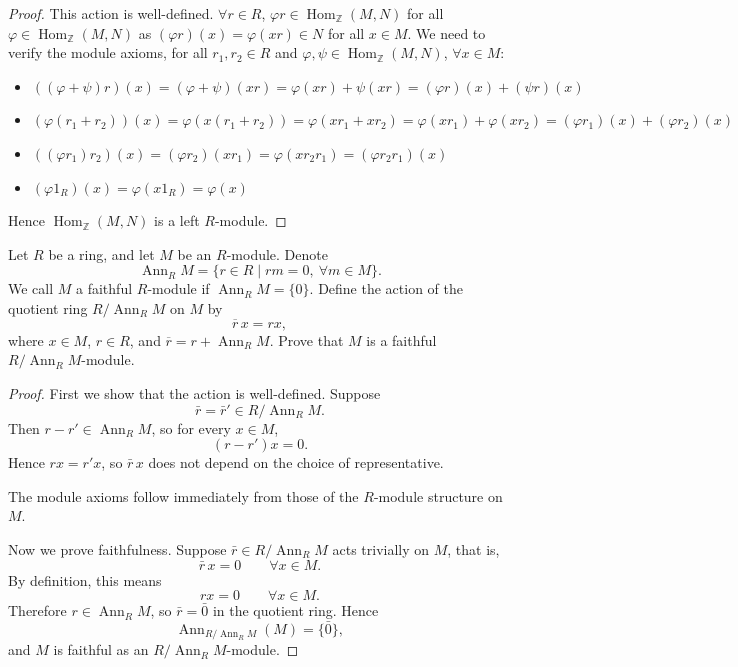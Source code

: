 \documentclass[11pt, a4paper]{report}
\begin{document}
\begin{proof}
    This action is well-defined. $\forall r \in R$, $\varphi r \in
    \operatorname{Hom}_{\mathbb{Z}}(M,N)$ for all $\varphi \in
    \operatorname{Hom}_{\mathbb{Z}}(M,N)$ as $(\varphi r)(x) = \varphi(xr) \in N$ for all
    $x \in M$. We need to verify the module axioms, for all $r_1, r_2 \in R$ and
    $\varphi, \psi \in \operatorname{Hom}_{\mathbb{Z}}(M,N)$, $\forall x \in M$:
    \begin{itemize}
        \item $((\varphi + \psi)r)(x) = (\varphi + \psi)(xr) = \varphi(xr) + \psi(xr) = (\varphi r)(x) + (\psi r)(x)$
        \item $(\varphi(r_1 + r_2))(x) = \varphi(x(r_1 + r_2)) = \varphi(xr_1 + xr_2) = \varphi(xr_1) + \varphi(xr_2) = (\varphi r_1)(x) + (\varphi r_2)(x)$
        \item $((\varphi r_1)r_2)(x) = (\varphi r_2)(xr_1) = \varphi(xr_2r_1) = (\varphi r_2 r_1)(x)$
        \item $( \varphi 1_R)(x) =  \varphi(x 1_R) = \varphi(x) $
    \end{itemize}
    Hence $\operatorname{Hom}_{\mathbb{Z}}(M,N)$ is a left $R$-module.
\end{proof}

\begin{exercise}
    Let $R$ be a ring, and let $M$ be an $R$-module. Denote
    \[
        \operatorname{Ann}_R M=\{r\in R \mid rm=0,\ \forall m\in M\}.
    \]
    We call $M$ a faithful $R$-module if $\operatorname{Ann}_R M=\{0\}$. Define the action
    of the quotient ring $R/\operatorname{Ann}_R M$ on $M$ by
    \[
        \overline{r}\,x=rx,
    \]
    where $x\in M$, $r\in R$, and $\overline{r}=r+\operatorname{Ann}_R M$. Prove that $M$
    is a faithful $R/\operatorname{Ann}_R M$-module.
\end{exercise}

\begin{proof}
    First we show that the action is well-defined. Suppose
    \[
        \bar r=\bar r' \in R/\operatorname{Ann}_R M.
    \]
    Then $r-r'\in \operatorname{Ann}_R M$, so for every $x\in M$,
    \[
        (r-r')x=0.
    \]
    Hence $rx=r'x$, so $\bar r\,x$ does not depend on the choice of representative.

    The module axioms follow immediately from those of the $R$-module structure on $M$.

    Now we prove faithfulness. Suppose $\bar r\in R/\operatorname{Ann}_R M$ acts trivially on
    $M$, that is,
    \[
        \bar r\,x=0 \qquad \forall x\in M.
    \]
    By definition, this means
    \[
        rx=0 \qquad \forall x\in M.
    \]
    Therefore $r\in \operatorname{Ann}_R M$, so $\bar r=\bar 0$ in the quotient ring. Hence
    \[
        \operatorname{Ann}_{R/\operatorname{Ann}_R M}(M)=\{\bar 0\},
    \]
    and $M$ is faithful as an $R/\operatorname{Ann}_R M$-module.
\end{proof}
\end{document}

